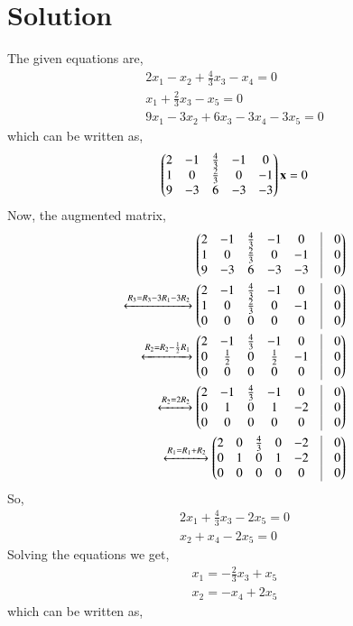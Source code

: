 \documentclass[journal,12pt,twocolumn]{IEEEtran}
\begin{document}
   \section{\textbf{Solution}}
   The given equations are,
   \begin{align}
   2x_1-x_2+\frac{4}{3}x_3-x_4=0\\
   x_1+\frac{2}{3}x_3-x_5=0\\
   9x_1-3x_2+6x_3-3x_4-3x_5=0
   \end{align}
   which can be written as,
   \begin{align}
  \begin{pmatrix}2&-1&\frac{4}{3}&-1&0\\1&0&\frac{2}{3}&0&-1\\9&-3&6&-3&-3\end{pmatrix}\mathbf{x}=0
   \end{align}
   Now, the augmented matrix,
   \begin{align}
     \myvec{2&-1&\frac{4}{3}&-1&0&\vrule&0\\1&0&\frac{2}{3}&0&-1&\vrule& 0\\9&-3&6&-3&-3&\vrule& 0}\\
        \xleftrightarrow{R_3=R_3-3R_1-3R_2}\myvec{2&-1&\frac{4}{3}&-1&0&\vrule&0\\1&0&\frac{2}{3}&0&-1&\vrule& 0\\0&0&0&0&0&\vrule& 0}\\
     \xleftrightarrow{R_2=R_2-\frac{1}{2}R_1}\myvec{2&-1&\frac{4}{3}&-1&0&\vrule&0\\0&\frac{1}{2}&0&\frac{1}{2}&-1&\vrule& 0\\0&0&0&0&0&\vrule& 0}\\
      \xleftrightarrow{R_2=2R_2}\myvec{2&-1&\frac{4}{3}&-1&0&\vrule&0\\0&1&0&1&-2&\vrule& 0\\0&0&0&0&0&\vrule& 0}\\
      \xleftrightarrow{R_1=R_1+R_2}\myvec{2&0&\frac{4}{3}&0&-2&\vrule&0\\0&1&0&1&-2&\vrule& 0\\0&0&0&0&0&\vrule& 0}
\end{align}
So,
\begin{align}
2x_1+\frac{4}{3}x_3-2x_5=0\\
x_2+x_4-2x_5=0
\end{align}
Solving the equations we get,
\begin{align}
x_1=-\frac{2}{3}x_3+x_5\\
x_2=-x_4+2x_5
\end{align}
which can be written as,
\end{document}
